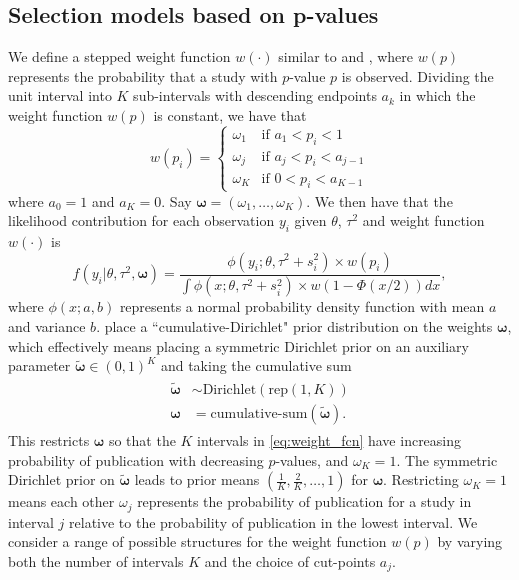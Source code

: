 \documentclass[12pt]{article}   	%
\numberwithin{equation}{section}
\begin{document}
\subsection{Selection models based on p-values} \label{sec:pvalue}

We define a stepped weight function $w(\cdot)$ similar to \citet{vevea1995pubbias} and \citet{vevea2005sensitivity}, where $w(p)$ represents the probability that a study with $p$-value $p$ is observed. Dividing the unit interval into $K$ sub-intervals with descending endpoints $a_k$ in which the weight function $w(p)$ is constant, we have that
\begin{equation} %
w(p_i) =
	\begin{cases}
		\omega_1 & \text{if $a_1 < p_i < 1$} \\
		\omega_j & \text{if $a_{j} < p_i < a_{j-1}$} \\
		\omega_K & \text{if $0 < p_i < a_{K-1}$}
	\end{cases} \label{eq:weight_fcn}
\end{equation}
where $a_0 = 1$ and $a_K = 0$. Say $\boldsymbol{\omega} = (\omega_1, \dots, \omega_K)$. We then have that the likelihood contribution for each observation $y_i$ given $\theta$, $\tau^2$ and weight function $w(\cdot)$ is 
\begin{equation} %
f(y_i \vert \theta, \tau^2, \boldsymbol{\omega}) = \frac{\phi(y_i ; \theta, \tau^2 + s_i^2) \times w(p_i)}{\int \phi(x ; \theta, \tau^2 + s_i^2) \times w(1 - \Phi(x/2)) dx}, \label{eq:weightednormal}
\end{equation}
where $\phi(x; a, b)$ represents a normal probability density function with mean $a$ and variance $b$. \citet{maier2020robma} place a ``cumulative-Dirichlet" prior distribution on the weights $\boldsymbol{\omega}$, which effectively means placing a symmetric Dirichlet prior on an auxiliary parameter $\widetilde{\boldsymbol{\omega}} \in (0, 1)^K$ and taking the cumulative sum 
\begin{align}
\begin{split}
\widetilde{\boldsymbol{\omega}} & \sim \text{Dirichlet}(\text{rep}(1, K))  \\
\boldsymbol{\omega} &= \text{cumulative-sum}(\widetilde{\boldsymbol{\omega}}). 
\end{split}
\end{align}
This restricts $\boldsymbol{\omega}$ so that the $K$ intervals in \eqref{eq:weight_fcn} have increasing probability of publication with decreasing $p$-values, and $\omega_K = 1$. The symmetric Dirichlet prior on $\widetilde{\boldsymbol{\omega}}$ leads to prior means $(\frac{1}{K}, \frac{2}{K}, \dots, 1)$ for $\boldsymbol{\omega}$. Restricting $\omega_K = 1$ means each other $\omega_j$ represents the probability of publication for a study in interval $j$ relative to the probability of publication in the lowest interval. We consider a range of possible structures for the weight function $w(p)$ by varying both the number of intervals $K$ and the choice of cut-points $a_j$.
\end{document}
